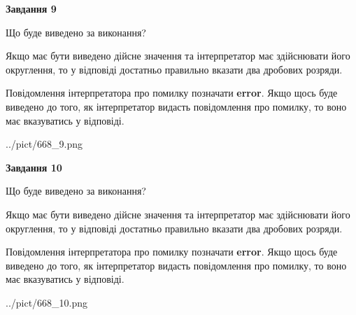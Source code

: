 \documentclass[12pt, ukrainian]{article}
\begin{document}
{\begin {Large}
{\begin {center}\textbf{Завдання 9}\end {center}}\par
Що буде виведено за виконання? \par

Якщо має бути виведено дійсне значення та інтерпретатор має здійснювати його округлення, 
то у відповіді достатньо правильно вказати два дробових розряди.

Повідомлення інтерпретатора про помилку позначати \textbf{error}.
Якщо щось буде виведено до того, як інтерпретатор видасть повідомлення про помилку, 
то воно має вказуватись у відповіді. \par

\begin{center}
	{../pict/668_9.png}
\end{center}
\newpage

{\begin {center}\textbf{Завдання 10}\end {center}}\par
Що буде виведено за виконання? \par

Якщо має бути виведено дійсне значення та інтерпретатор має здійснювати його округлення, 
то у відповіді достатньо правильно вказати два дробових розряди.

Повідомлення інтерпретатора про помилку позначати \textbf{error}.
Якщо щось буде виведено до того, як інтерпретатор видасть повідомлення про помилку, 
то воно має вказуватись у відповіді. \par

\begin{center}
	{../pict/668_10.png}
\end{center}
\newpage

\end {Large}}
\end{document}
